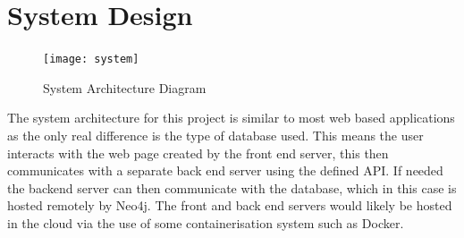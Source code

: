 \section{System Design}
\begin{figure}[h]
    \centering
    \texttt{[image: system]}
    \caption{System Architecture Diagram}
\end{figure}
The system architecture for this project is similar to most web based applications as the only real difference is the type of database used.
This means the user interacts with the web page created by the front end server, this then communicates with a separate back end server 
using the defined API. If needed the backend server can then communicate with the database, which in this case is hosted 
remotely by Neo4j.
The front and back end servers would likely be hosted in the cloud via the use of some containerisation system such as Docker.
